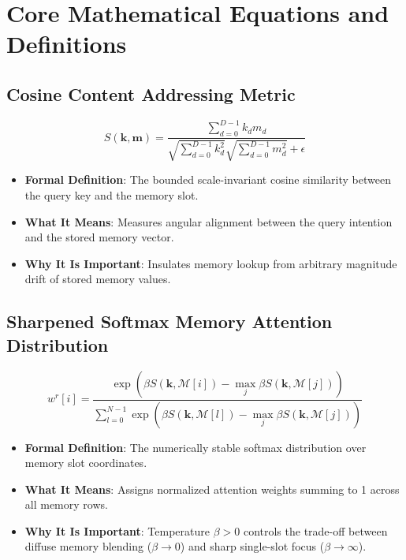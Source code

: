 \documentclass[11pt,a4paper]{article}
\theoremstyle{definition}
\begin{document}
\section{Core Mathematical Equations and Definitions}

\subsection{Cosine Content Addressing Metric}
{\boldmath
\begin{equation}
S(\mathbf{k}, \mathbf{m}) = \frac{\sum_{d=0}^{D-1} k_d m_d}{\sqrt{\sum_{d=0}^{D-1} k_d^2} \sqrt{\sum_{d=0}^{D-1} m_d^2} + \epsilon}
\end{equation}
}
\begin{itemize}
    \item \textbf{Formal Definition}: The bounded scale-invariant cosine similarity between the query key and the memory slot.
    \item \textbf{What It Means}: Measures angular alignment between the query intention and the stored memory vector.
    \item \textbf{Why It Is Important}: Insulates memory lookup from arbitrary magnitude drift of stored memory values.
\end{itemize}

\subsection{Sharpened Softmax Memory Attention Distribution}
{\boldmath
\begin{equation}
w^r[i] = \frac{\exp\left( \beta S(\mathbf{k}, \mathcal{M}[i]) - \max_j \beta S(\mathbf{k}, \mathcal{M}[j]) \right)}{\sum_{l=0}^{N-1} \exp\left( \beta S(\mathbf{k}, \mathcal{M}[l]) - \max_j \beta S(\mathbf{k}, \mathcal{M}[j]) \right)}
\end{equation}
}
\begin{itemize}
    \item \textbf{Formal Definition}: The numerically stable softmax distribution over memory slot coordinates.
    \item \textbf{What It Means}: Assigns normalized attention weights summing to 1 across all memory rows.
    \item \textbf{Why It Is Important}: Temperature $\beta > 0$ controls the trade-off between diffuse memory blending ($\beta \to 0$) and sharp single-slot focus ($\beta \to \infty$).
\end{itemize}
\end{document}

